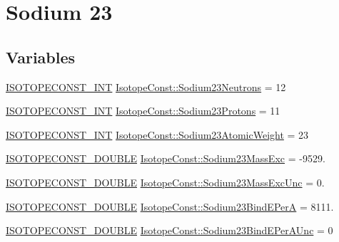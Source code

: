 \hypertarget{group___isotope_const-_sodium-_na23}{}\section{Sodium 23}
\label{group___isotope_const-_sodium-_na23}
\subsection*{Variables}
\begin{DoxyCompactItemize}
\item 
\mbox{\hyperlink{group___isotope_const-_macros_ga5f18360b3e99483a35c32d789e62621c}{I\+S\+O\+T\+O\+P\+E\+C\+O\+N\+S\+T\+\_\+\+I\+NT}} \mbox{\hyperlink{group___isotope_const-_sodium-_na23_gac270bc8877dc8661af71f088533ab946}{Isotope\+Const\+::\+Sodium23\+Neutrons}} = 12
\item 
\mbox{\hyperlink{group___isotope_const-_macros_ga5f18360b3e99483a35c32d789e62621c}{I\+S\+O\+T\+O\+P\+E\+C\+O\+N\+S\+T\+\_\+\+I\+NT}} \mbox{\hyperlink{group___isotope_const-_sodium-_na23_gadfc86768bb252e08157304cd87f0be33}{Isotope\+Const\+::\+Sodium23\+Protons}} = 11
\item 
\mbox{\hyperlink{group___isotope_const-_macros_ga5f18360b3e99483a35c32d789e62621c}{I\+S\+O\+T\+O\+P\+E\+C\+O\+N\+S\+T\+\_\+\+I\+NT}} \mbox{\hyperlink{group___isotope_const-_sodium-_na23_ga1aa5070e00944dccebe51082cced9529}{Isotope\+Const\+::\+Sodium23\+Atomic\+Weight}} = 23
\item 
\mbox{\hyperlink{group___isotope_const-_macros_ga8f45a7272ce02c0b4c65c44636ed719a}{I\+S\+O\+T\+O\+P\+E\+C\+O\+N\+S\+T\+\_\+\+D\+O\+U\+B\+LE}} \mbox{\hyperlink{group___isotope_const-_sodium-_na23_ga394edc4658715d3566d15e02df13d5b2}{Isotope\+Const\+::\+Sodium23\+Mass\+Exc}} = -\/9529.
\item 
\mbox{\hyperlink{group___isotope_const-_macros_ga8f45a7272ce02c0b4c65c44636ed719a}{I\+S\+O\+T\+O\+P\+E\+C\+O\+N\+S\+T\+\_\+\+D\+O\+U\+B\+LE}} \mbox{\hyperlink{group___isotope_const-_sodium-_na23_ga1beff2837ae0122085d938879932ef8d}{Isotope\+Const\+::\+Sodium23\+Mass\+Exc\+Unc}} = 0.
\item 
\mbox{\hyperlink{group___isotope_const-_macros_ga8f45a7272ce02c0b4c65c44636ed719a}{I\+S\+O\+T\+O\+P\+E\+C\+O\+N\+S\+T\+\_\+\+D\+O\+U\+B\+LE}} \mbox{\hyperlink{group___isotope_const-_sodium-_na23_gab19fd46f30eecd1fda6e5d4962ed6dd5}{Isotope\+Const\+::\+Sodium23\+Bind\+E\+PerA}} = 8111.
\item 
\mbox{\hyperlink{group___isotope_const-_macros_ga8f45a7272ce02c0b4c65c44636ed719a}{I\+S\+O\+T\+O\+P\+E\+C\+O\+N\+S\+T\+\_\+\+D\+O\+U\+B\+LE}} \mbox{\hyperlink{group___isotope_const-_sodium-_na23_gaf458314b4029149f850901443fcc8ca2}{Isotope\+Const\+::\+Sodium23\+Bind\+E\+Per\+A\+Unc}} = 0

\end{DoxyCompactItemize}
